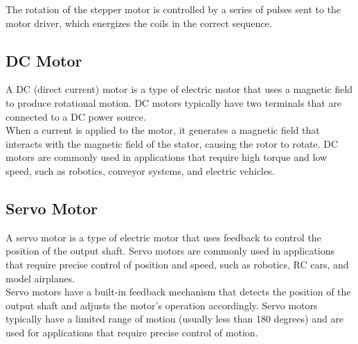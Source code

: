\documentclass[11pt]{article}
\begin{document}
The rotation of the stepper motor is controlled by a series of pulses sent to the motor
driver, which energizes the coils in the correct sequence.

\subsection{DC Motor}

A DC (direct current) motor is a type of electric motor that uses a
magnetic field to produce rotational motion. DC motors typically have
two terminals that are connected to a DC power source. \\

When a
current is applied to the motor, it generates a magnetic field that
interacts with the magnetic field of the stator, causing the rotor to
rotate. DC motors are commonly used in applications that require high
torque and low speed, such as robotics, conveyor systems, and electric
vehicles.

\subsection{Servo Motor}
A servo motor is a type of electric motor that uses feedback to control
the position of the output shaft. Servo motors are commonly used in
applications that require precise control of position and speed, such as
robotics, RC cars, and model airplanes.\\

Servo motors have a built-in
feedback mechanism that detects the position of the output shaft and
adjusts the motor's operation accordingly. Servo motors typically have
a limited range of motion (usually less than 180 degrees) and are used
for applications that require precise control of motion.
\end{document}
